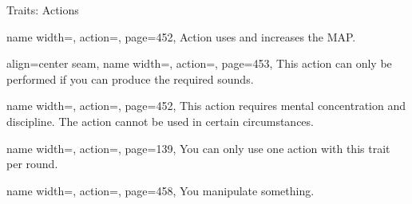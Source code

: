 \renewcommand{\PageBottomReferences}{%
    \hfill LCR = Legacy Core Rulebook
    \hfill DA = Dark Archive
    \hfill GnM = Gods and magic
    \hfill GMC = GM Core\\
    \hfill SoM = Secrets of Magic
    \hfill GG = Guns \& Gears
    \hfill TV = Treasure Vault
    \hfill AG = Ancestry Guide
    \hfill ME = Magwani Expanse
    \hfill Le = Legends
}%
\setlength{\parindent}{0mm}%
\begin{PageFront}
    \begin{Tables}{\frontTableHeight}
        \begin{Table}{Traits: Actions}
            \begin{entry}{}{%
                name width=\conditionLength,%
                action=\Attack,
                page=452,
            }
                Action uses  and increases the MAP. \hfill
            \end{entry}
            \begin{entry}{}{%
                align=center seam,
                name width=\conditionLength,%
                action=\Auditory,
                page=453,
            }
                This action can only be performed if you can produce the required sounds.\\
            \end{entry}
            \begin{entry}{}{%
                name width=\conditionLength,%
                action=\Concentrate,
                page=452,
            }
                This action requires mental concentration and discipline.
                The action cannot be used in certain circumstances.
            \end{entry}
            \begin{entry}{}{%
                name width=\conditionLength,%
                action=\Flourish,
                page=139,
            }
                You can only use one action with this trait per round.
            \end{entry}
            \begin{entry}{}{%
                name width=\conditionLength,%
                action=\Manipulate,
                page=458,
            }
                You manipulate something.

\end{entry}
\end{Table}
\end{Tables}
\end{PageFront}
